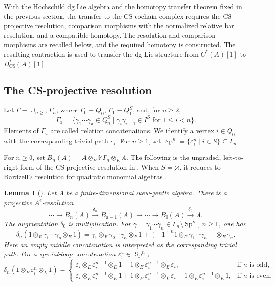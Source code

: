 \documentclass[11pt,a4paper,reqno]{amsart}
\newcommand{\mK}{\mathbb K}
\newcommand{\Sp}{\operatorname{Sp}}
\newcommand{\ep}{\varepsilon}
\theoremstyle{plain}
\newtheorem{lemma}[lemma]{Lemma}
\theoremstyle{definition}
\numberwithin{equation}{section}
\begin{document}
	With the Hochschild dg Lie algebra and the homotopy transfer theorem
	fixed in the previous section, the transfer to the CS cochain complex
	requires the CS-projective resolution, comparison morphisms with the
	normalized relative bar resolution, and a compatible homotopy.
	The resolution and comparison morphisms are recalled below, and the
	required homotopy is constructed. The resulting contraction is used
	to transfer the dg Lie structure from $C^*(A)[1]$ to
	$B_{\mathrm{CS}}^*(A)[1]$.
	\subsection{The CS-projective resolution}
	
 Let
	$\Gamma=\cup_{n\geq0}\Gamma_n$,
	where $\Gamma_0=Q_0$, $\Gamma_1=Q_1^S$, and, for $n\geq2$,
	\[
	\Gamma_n=
	\{\gamma_1\cdots\gamma_n\in Q_n^S \mid 
	\gamma_i\gamma_{i+1}\in I^S\text{ for }1\leq i<n\}.
	\]
	Elements of $\Gamma_n$ are called relation concatenations. We identify a
	vertex $i\in Q_0$ with the corresponding trivial path $e_i$. For $n\geq1$,
	set $\Sp^n=\{\ep_i^n \mid i\in S\}\subseteq\Gamma_n$.
	
	For $n\geq0$, set
	$B_n(A)=A\otimes_E\mK\Gamma_n\otimes_E A$. The following is the
	ungraded, left-to-right form of the CS-projective resolution in
	\cite[Proposition~2.8]{BSSWW26}. When $S=\varnothing$, it reduces to
	Bardzell's resolution for quadratic monomial algebras \cite{Bar97}.
	
	\begin{lemma}[{\cite[Proposition~2.8]{BSSWW26}}]\label{thm:CS-resolution}
		Let $A$ be a finite-dimensional skew-gentle algebra.  There is a projective
		$A^e$-resolution
		\[
		\cdots\longrightarrow
		B_n(A)
		\xrightarrow{\delta_n}
		B_{n-1}(A)
		\longrightarrow\cdots\longrightarrow
		B_0(A)
		\xrightarrow{\delta_0}A.
		\]
		The augmentation $\delta_0$ is multiplication.  For
		$\gamma=\gamma_1\cdots\gamma_n\in\Gamma_n\setminus\Sp^n$, $n\geq1$, one has
		\[
		\delta_n(1\otimes_E\gamma_1\cdots\gamma_n\otimes_E1)
		=
		\gamma_1\otimes_E\gamma_2\cdots\gamma_n\otimes_E1
		+(-1)^n1\otimes_E\gamma_1\cdots\gamma_{n-1}\otimes_E\gamma_n.
		\]
		Here an empty middle concatenation is interpreted as the corresponding trivial
		path.  For a special-loop concatenation $\ep_i^n\in\Sp^n$,
		\[
		\delta_n(1\otimes_E\ep_i^n\otimes_E1)=
	\begin{cases}
		\ep_i\otimes_E\ep_i^{n-1}\otimes_E1
		-1\otimes_E\ep_i^{n-1}\otimes_E\ep_i,
		& \text{if } n\text{ is odd},\\
		\ep_i\otimes_E\ep_i^{n-1}\otimes_E1
		+1\otimes_E\ep_i^{n-1}\otimes_E\ep_i
		-1\otimes_E\ep_i^{n-1}\otimes_E1,
		& \text{if } n\text{ is even}.
	\end{cases}
		\]
	\end{lemma}
	
\end{document}
